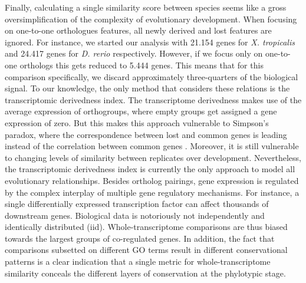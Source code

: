 Finally, calculating a single similarity score between species seems like a gross oversimplification of the complexity of evolutionary development. When focusing on one-to-one orthologues features, all newly derived and lost features are ignored. For instance, we started our analysis with 21.154 genes for \textit{X. tropicalis} and 24.417 genes for \textit{D. rerio} respectively. However, if we focus only on one-to-one orthologs this gets reduced to 5.444 genes. This means that for this comparison specifically, we discard approximately three-quarters of the biological signal. To our knowledge, the only method that considers these relations is the transcriptomic derivedness index\cite{Leong2021}. The transcriptome derivedness makes use of the average expression of orthogroups, where empty groups get assigned a gene expression of zero. But this makes this approach vulnerable to Simpson's paradox, where the correspondence between lost and common genes is leading instead of the correlation between common genes \cite{Saccenti2023}. Moreover, it is still vulnerable to changing levels of similarity between replicates over development. Nevertheless, the transcriptomic derivedness index is currently the only approach to model all evolutionary relationships. Besides ortholog pairings, gene expression is regulated by the complex interplay of multiple gene regulatory mechanisms. For instance, a single differentially expressed transcription factor can affect thousands of downstream genes. Biological data is notoriously not independently and identically distributed (iid). Whole-transcriptome comparisons are thus biased towards the largest groups of co-regulated genes. In addition, the fact that comparisons subsetted on different GO terms result in different conservational patterns is a clear indication that a single metric for whole-transcriptome similarity conceals the different layers of conservation at the phylotypic stage\cite{Malik2017,Gildor2019,Onimaru2021}.

